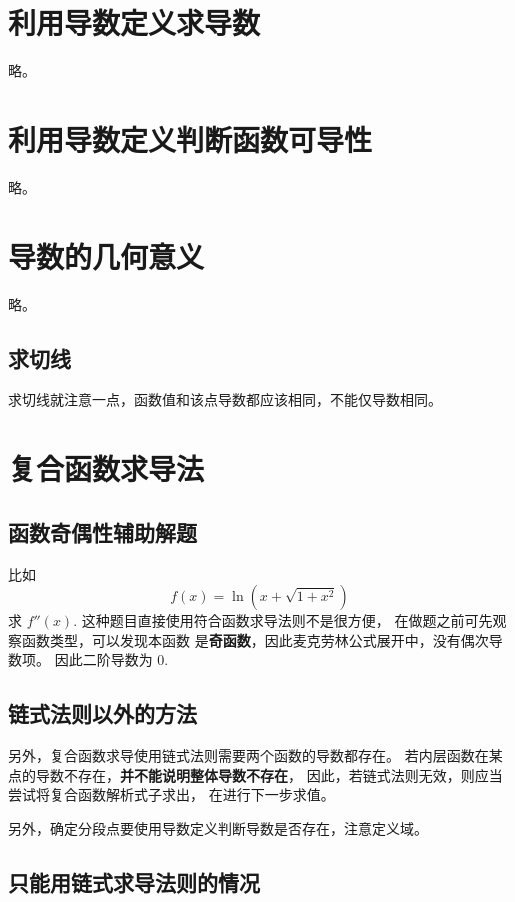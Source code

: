 \section{利用导数定义求导数}

略。

\section{利用导数定义判断函数可导性}

略。

\section{导数的几何意义}

略。

\subsection{求切线}

求切线就注意一点，函数值和该点导数都应该相同，不能仅导数相同。

\section{复合函数求导法}

\subsection{函数奇偶性辅助解题}

比如
\[
    f(x) = \ln(x+\sqrt{1+x^2})
\]
求 $f''(x)$.
这种题目直接使用符合函数求导法则不是很方便，
在做题之前可先观察函数类型，可以发现本函数
是\textbf{奇函数}，因此麦克劳林公式展开中，没有偶次导数项。
因此二阶导数为 0.

\subsection{链式法则以外的方法}

另外，复合函数求导使用链式法则需要两个函数的导数都存在。
若内层函数在某点的导数不存在，\textbf{并不能说明整体导数不存在}，
因此，若链式法则无效，则应当尝试将复合函数解析式子求出，
在进行下一步求值。

另外，确定分段点要使用导数定义判断导数是否存在，注意定义域。

\subsection{只能用链式求导法则的情况}

